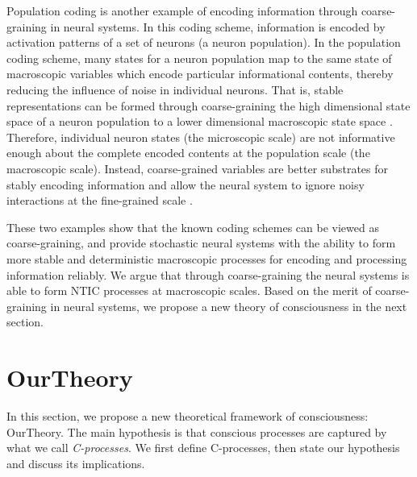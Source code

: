 \documentclass[utf8]{article}
\begin{document}
		Population coding is another example of encoding information through coarse-graining in neural systems. In this coding scheme, information is encoded by activation patterns of a set of neurons (a neuron population). In the population coding scheme, many states for a neuron population map to the same state of macroscopic variables which encode particular informational contents, thereby reducing the influence of noise in individual neurons. That is, stable representations can be formed through coarse-graining the high dimensional state space of a neuron population to a lower dimensional macroscopic state space \citep{kristan1997population, pouget2000information, binder2009encyclopedia, QuianQuiroga2009}. Therefore, individual neuron states (the microscopic scale) are not informative enough about the complete encoded contents at the population scale (the macroscopic scale). Instead, coarse-grained variables are better substrates for stably encoding information and allow the neural system to ignore noisy interactions at the fine-grained scale \citep{Woodward2007-WOOCWA}.
		
        These two examples show that the known coding schemes can be viewed as coarse-graining, and provide stochastic neural systems with the ability to form more stable and deterministic macroscopic processes for encoding and processing information reliably. We argue that through coarse-graining the neural systems is able to form NTIC processes at macroscopic scales. Based on the merit of coarse-graining in neural systems, we propose a new theory of consciousness in the next section. 



	\section{\acf{OurTheory}}\label{sec:OurTheory}
	
        In this section, we propose a new theoretical framework of consciousness: \acf{OurTheory}. The main hypothesis is that conscious processes are captured by what we call \textit{C-processes}. We first define C-processes, then state our hypothesis and discuss its implications.
        
\end{document}
